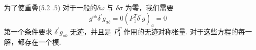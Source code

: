 \\

为了使重叠(5.2 .5) 对于一般的$\delta \omega$ 与 $\delta \sigma$ 为零，我们需要
\begin{subequations}
\begin{equation}
g^{a b} \delta^{\prime} g_{a b} =0 
\end{equation}	
\begin{equation}
\left(P_{1}^{T} \delta^{\prime} g\right)_{a} =0
\end{equation}			
\end{subequations}
第一个条件要求 $\delta^{\prime} g_{a b}$ 无迹，并且是 $P_{1}^{T}$ 作用的无迹对称张量. 对于这些方程的每一解，都存在一个模.\\

